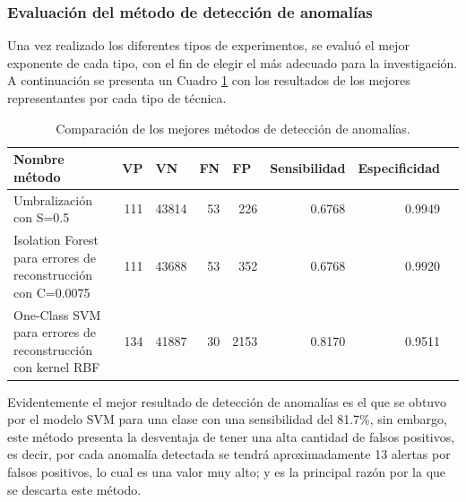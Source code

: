 \subsubsection{Evaluaci\'{o}n del m\'{e}todo de detecci\'{o}n de anomal\'{i}as}

Una vez realizado los diferentes tipos de experimentos, se evalu\'{o} el mejor exponente de cada tipo, con el fin de elegir el m\'{a}s adecuado para la investigaci\'{o}n. A continuaci\'{o}n se presenta un Cuadro \ref{table:evaluacion_metodo_anomalias} con los resultados de los mejores representantes por cada tipo de t\'{e}cnica.

\begin{table}[H]
\centering
\begin{center}
\begin{tabular}{|p{40mm}|r|r|r|r|r|r|r|}
\hline
\textbf{Nombre m\'{e}todo} & \multicolumn{1}{l|}{\textbf{VP}} & \multicolumn{1}{l|}{\textbf{VN}}& \multicolumn{1}{l|}{\textbf{FN}}& \multicolumn{1}{l|}{\textbf{FP}} & \multicolumn{1}{l|}{\textbf{Sensibilidad}} & \multicolumn{1}{l|}{\textbf{Especificidad}} \\ \hline
Umbralizaci\'{o}n con S=0.5 & \cellcolor[HTML]{AADD99} 111 & \cellcolor[HTML]{AADD99} 43814 & \cellcolor[HTML]{FFCE93} 53 & \cellcolor[HTML]{FFCE93} 226 & 0.6768 & 0.9949 \\ \hline
Isolation Forest para errores de reconstrucci\'{o}n con C=0.0075 & \cellcolor[HTML]{AADD99} 111 & \cellcolor[HTML]{AADD99} 43688 & \cellcolor[HTML]{FFCE93} 53 & \cellcolor[HTML]{FFCE93} 352 & 0.6768 & 0.9920 \\ \hline
One-Class SVM para errores de reconstrucci\'{o}n con kernel RBF& \cellcolor[HTML]{AADD99} 134 & \cellcolor[HTML]{AADD99} 41887 & \cellcolor[HTML]{FFCE93} 30 & \cellcolor[HTML]{FFCE93} 2153 & 0.8170 & 0.9511 \\ \hline
\end{tabular}
\end{center}
\caption{Comparaci\'{o}n de los mejores m\'{e}todos de detecci\'{o}n de anomal\'{i}as.}

\label{table:evaluacion_metodo_anomalias}
\end{table}

Evidentemente el mejor resultado de detecci\'{o}n de anomal\'{i}as es el que se obtuvo por el modelo SVM para una clase con una sensibilidad del 81.7\%, sin embargo, este m\'{e}todo presenta la desventaja de tener una alta cantidad de falsos positivos, es decir, por cada anomal\'{i}a detectada se tendr\'{a} aproximadamente 13 alertas por falsos positivos, lo cual es una valor muy alto; y es la principal raz\'{o}n por la que se descarta este m\'{e}todo.


